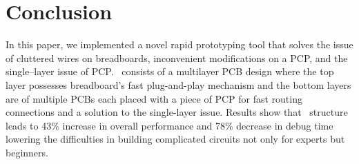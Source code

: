 \section{Conclusion}

In this paper, we implemented a novel rapid prototyping tool that solves the issue of cluttered wires on breadboards, inconvenient modifications on a PCP, and the single--layer issue of PCP. \papertitle\ consists of a multilayer PCB design where the top layer possesses breadboard's fast plug-and-play mechanism and the bottom layers are of multiple PCBs each placed with a piece of PCP for fast routing connections and a solution to the single-layer issue. Results show that \papertitle\ structure leads to 43\% increase in overall performance and 78\% decrease in debug time lowering the difficulties in building complicated circuits not only for experts but beginners.


